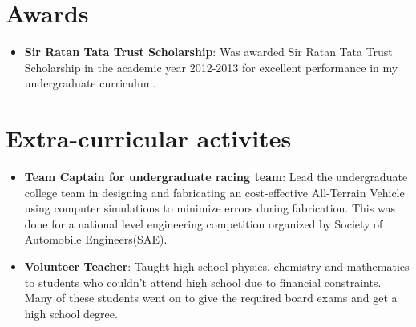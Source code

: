 \documentclass[letterpaper,9pt]{article}
\newcommand{\resumeItem}[2]{
  \item\small{
    \textbf{#1}{: #2 \vspace{-2pt}}
  }
}
\newcommand{\resumeSubItem}[2]{\resumeItem{#1}{#2}\vspace{-4pt}}
\newcommand{\resumeSubHeadingListStart}{\begin{itemize}[leftmargin=*]}
\newcommand{\resumeSubHeadingListEnd}{\end{itemize}}
\begin{document}
\section{Awards}
  \resumeSubHeadingListStart
    \resumeSubItem{Sir Ratan Tata Trust Scholarship}
      {Was awarded Sir Ratan Tata Trust Scholarship in the academic year 2012-2013 for excellent performance in my undergraduate curriculum.}
  \resumeSubHeadingListEnd

\section{Extra-curricular activites}
  \resumeSubHeadingListStart
    \resumeSubItem{Team Captain for undergraduate racing team}
      {Lead the undergraduate college team in designing and fabricating an cost-effective All-Terrain Vehicle using computer simulations to minimize errors during fabrication. This was done for a national level engineering competition organized by Society of Automobile Engineers(SAE).}
    \resumeSubItem{Volunteer Teacher}
      {Taught high school physics, chemistry and mathematics to students who couldn't attend high school due to financial constraints. Many of these students went on to give the required board exams and get a high school degree.}
  \resumeSubHeadingListEnd




%


\end{document}
